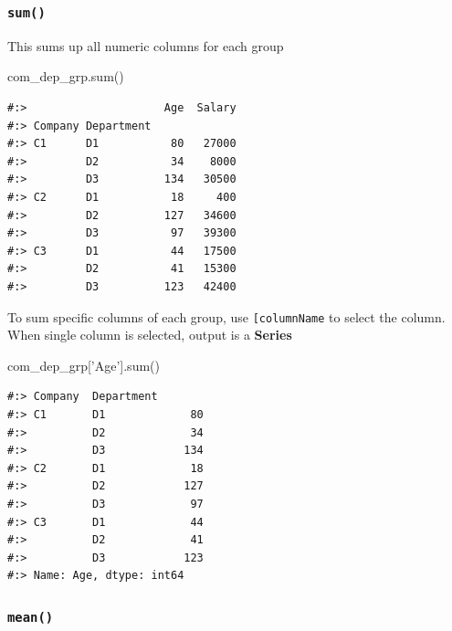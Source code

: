\documentclass[
]{book}
\newenvironment{Shaded}{\begin{snugshade}}{\end{snugshade}}
\newcommand{\BuiltInTok}[1]{#1}
\newcommand{\NormalTok}[1]{#1}
\newcommand{\StringTok}[1]{\textcolor[rgb]{0.5,0.5,0.5}{#1}}
\begin{document}
\hypertarget{sum}{%
\subsubsection{\texorpdfstring{\texttt{sum()}}{sum()}}\label{sum}}

This sums up all numeric columns for each group

\begin{Shaded}
\begin{Highlighting}[]
\NormalTok{com_dep_grp.}\BuiltInTok{sum}\NormalTok{()}
\end{Highlighting}
\end{Shaded}

\begin{verbatim}
#:>                     Age  Salary
#:> Company Department             
#:> C1      D1           80   27000
#:>         D2           34    8000
#:>         D3          134   30500
#:> C2      D1           18     400
#:>         D2          127   34600
#:>         D3           97   39300
#:> C3      D1           44   17500
#:>         D2           41   15300
#:>         D3          123   42400
\end{verbatim}

To sum specific columns of each group, use \texttt{{[}\textquotesingle{}columnName\textquotesingle{}{]}} to select the column.\\
When single column is selected, output is a \textbf{Series}

\begin{Shaded}
\begin{Highlighting}[]
\NormalTok{com_dep_grp[}\StringTok{'Age'}\NormalTok{].}\BuiltInTok{sum}\NormalTok{()}
\end{Highlighting}
\end{Shaded}

\begin{verbatim}
#:> Company  Department
#:> C1       D1             80
#:>          D2             34
#:>          D3            134
#:> C2       D1             18
#:>          D2            127
#:>          D3             97
#:> C3       D1             44
#:>          D2             41
#:>          D3            123
#:> Name: Age, dtype: int64
\end{verbatim}

\hypertarget{mean}{%
\subsubsection{\texorpdfstring{\texttt{mean()}}{mean()}}\label{mean}}
\end{document}

